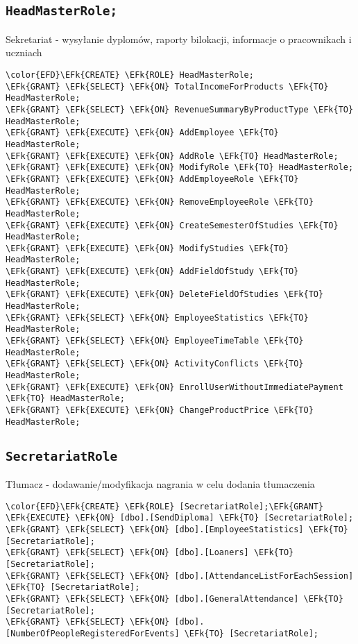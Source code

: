 \documentclass[11pt]{article}
\newcommand{\EFk}[1]{\textcolor{EFk}{\textbf{#1}}} %
\begin{document}
\subsection{\texttt{HeadMasterRole;}}
\label{sec:org37d212e}
Sekretariat - wysyłanie dyplomów, raporty bilokacji, informacje o pracownikach i uczniach
\begin{Code}
\begin{Verbatim}
\color{EFD}\EFk{CREATE} \EFk{ROLE} HeadMasterRole;
\EFk{GRANT} \EFk{SELECT} \EFk{ON} TotalIncomeForProducts \EFk{TO} HeadMasterRole;
\EFk{GRANT} \EFk{SELECT} \EFk{ON} RevenueSummaryByProductType \EFk{TO} HeadMasterRole;
\EFk{GRANT} \EFk{EXECUTE} \EFk{ON} AddEmployee \EFk{TO} HeadMasterRole;
\EFk{GRANT} \EFk{EXECUTE} \EFk{ON} AddRole \EFk{TO} HeadMasterRole;
\EFk{GRANT} \EFk{EXECUTE} \EFk{ON} ModifyRole \EFk{TO} HeadMasterRole;
\EFk{GRANT} \EFk{EXECUTE} \EFk{ON} AddEmployeeRole \EFk{TO} HeadMasterRole;
\EFk{GRANT} \EFk{EXECUTE} \EFk{ON} RemoveEmployeeRole \EFk{TO} HeadMasterRole;
\EFk{GRANT} \EFk{EXECUTE} \EFk{ON} CreateSemesterOfStudies \EFk{TO} HeadMasterRole;
\EFk{GRANT} \EFk{EXECUTE} \EFk{ON} ModifyStudies \EFk{TO} HeadMasterRole;
\EFk{GRANT} \EFk{EXECUTE} \EFk{ON} AddFieldOfStudy \EFk{TO} HeadMasterRole;
\EFk{GRANT} \EFk{EXECUTE} \EFk{ON} DeleteFieldOfStudies \EFk{TO} HeadMasterRole;
\EFk{GRANT} \EFk{SELECT} \EFk{ON} EmployeeStatistics \EFk{TO} HeadMasterRole;
\EFk{GRANT} \EFk{SELECT} \EFk{ON} EmployeeTimeTable \EFk{TO} HeadMasterRole;
\EFk{GRANT} \EFk{SELECT} \EFk{ON} ActivityConflicts \EFk{TO} HeadMasterRole;
\EFk{GRANT} \EFk{EXECUTE} \EFk{ON} EnrollUserWithoutImmediatePayment \EFk{TO} HeadMasterRole;
\EFk{GRANT} \EFk{EXECUTE} \EFk{ON} ChangeProductPrice \EFk{TO} HeadMasterRole;
\end{Verbatim}
\end{Code}
\subsection{\texttt{SecretariatRole}}
\label{sec:org76d117c}
Tłumacz - dodawanie/modyfikacja nagrania w celu dodania tłumaczenia
\begin{Code}
\begin{Verbatim}
\color{EFD}\EFk{CREATE} \EFk{ROLE} [SecretariatRole];\EFk{GRANT} \EFk{EXECUTE} \EFk{ON} [dbo].[SendDiploma] \EFk{TO} [SecretariatRole];
\EFk{GRANT} \EFk{SELECT} \EFk{ON} [dbo].[EmployeeStatistics] \EFk{TO} [SecretariatRole];
\EFk{GRANT} \EFk{SELECT} \EFk{ON} [dbo].[Loaners] \EFk{TO} [SecretariatRole];
\EFk{GRANT} \EFk{SELECT} \EFk{ON} [dbo].[AttendanceListForEachSession] \EFk{TO} [SecretariatRole];
\EFk{GRANT} \EFk{SELECT} \EFk{ON} [dbo].[GeneralAttendance] \EFk{TO} [SecretariatRole];
\EFk{GRANT} \EFk{SELECT} \EFk{ON} [dbo].[NumberOfPeopleRegisteredForEvents] \EFk{TO} [SecretariatRole];
\end{Verbatim}
\end{Code}
\end{document}
